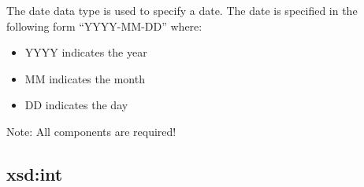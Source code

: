 The date data type is used to specify a date. The date is specified in
the following form ``YYYY-MM-DD'' where:

\begin{itemize}
\itemsep1pt\parskip0pt
\item
  YYYY indicates the year
\item
  MM indicates the month
\item
  DD indicates the day
\end{itemize}

Note: All components are required!

\subsection{xsd:int}
